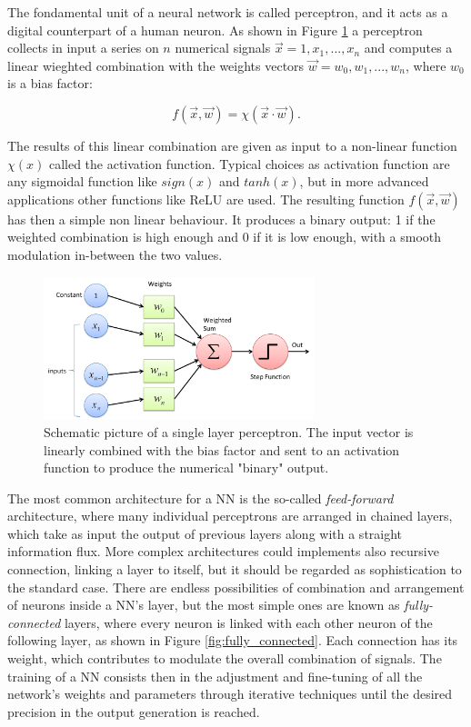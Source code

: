 \documentclass[12pt,a4paper]{report}
\begin{document}
The fondamental unit of a neural network is called perceptron, and it acts as a digital counterpart of a human neuron. As shown in Figure \ref{fig:perceptron} a perceptron collects in input a series on $n$ numerical signals $\vec{x} = 1, x_1, ..., x_n $ and computes a linear wieghted combination with the weights vectors $\vec{w} = w_0, w_1, ..., w_n$, where $w_0$ is a bias factor:

\begin{equation}
    f(\vec{x},\vec{w}) = \chi(\vec{x} \cdot \vec{w}).
\end{equation}

The results of this linear combination are given as input to a non-linear function $\chi(x)$ called the activation function. Typical choices as activation function are any sigmoidal function like $sign(x)$ and $tanh(x)$, but in more advanced applications other functions like ReLU \cite{1803.08375} are used. The resulting function $f(\vec{x},\vec{w})$ has then a simple non linear behaviour. It produces a binary output: 1 if the weighted combination is high enough and 0 if it is low enough, with a smooth modulation in-between the two values.

\begin{figure}
    \centering
    \includegraphics[width = 0.7\textwidth]{images/perceptron}
    \caption{Schematic picture of a single layer perceptron. The input vector is linearly combined with the bias factor and sent to an activation function to produce the numerical "binary" output.}
    \label{fig:perceptron}
\end{figure}

The most common architecture for a NN is the so-called \textit{feed-forward} architecture, where many individual perceptrons are arranged in chained layers, which take as input the output of previous layers along with a straight information flux. More complex architectures could implements also recursive connection, linking a layer to itself, but it should be regarded as sophistication to the standard case. There are endless possibilities of combination and arrangement of neurons inside a NN's layer, but the most simple ones are known as \textit{fully-connected} layers, where every neuron is linked with each other neuron of the following layer, as shown in Figure \ref{fig:fully_connected}. Each connection has its weight, which contributes to modulate the overall combination of signals. The training of a NN consists then in the adjustment and fine-tuning of all the network's weights and parameters through iterative techniques until the desired precision in the output generation is reached.
\end{document}
